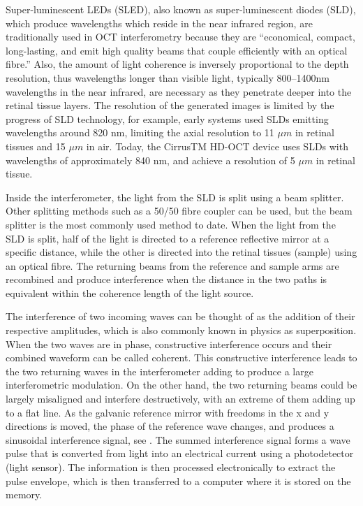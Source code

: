 Super-luminescent LEDs (SLED), also known as super-luminescent diodes (SLD),
which produce wavelengths which reside in the near infrared region, are
traditionally used in OCT interferometry because they are “economical,
compact, long-lasting, and emit high quality beams that couple efficiently
with an optical fibre.” \cite{mbib_6} Also, the amount of light coherence
is inversely proportional to the depth resolution, thus wavelengths longer
than visible light, typically 800–1400nm wavelengths in the near infrared,
are necessary as they penetrate deeper into the retinal tissue layers.\cite{mbib_4,mbib_7}
The resolution of the generated images is limited by the progress of SLD
technology, for example, early systems used SLDs emitting wavelengths around
820 nm, limiting the axial resolution to 11 $\mu m$ in retinal tissues and 15 $\mu m$
in air. \cite{mbib_6}  Today, the CirrusTM HD-OCT device uses SLDs with wavelengths
of approximately 840 nm, and achieve a resolution of 5 $\mu m$ in retinal tissue.\cite{mbib_7}

Inside the interferometer, the light from the SLD is split using a beam splitter.
Other splitting methods such as a 50/50 fibre coupler can be used, but the beam
splitter is the most commonly used method to date.  When the light from the SLD
is split, half of the light is directed to a reference reflective mirror at a
specific distance, while the other is directed into the retinal tissues (sample)
using an optical fibre.  The returning beams from the reference and sample arms
are recombined and produce interference when the distance in the two paths is
equivalent within the coherence length of the light source. \cite{mbib_5,mbib_6}

The interference of two incoming waves can be thought of as the addition of their
respective amplitudes, which is also commonly known in physics as superposition.
When the two waves are in phase, constructive interference occurs and their combined
waveform can be called coherent.  This constructive interference leads to the two
returning waves in the interferometer adding to produce a large interferometric
modulation.  On the other hand, the two returning beams could be largely misaligned
and interfere destructively, with an extreme of them adding up to a flat line.
As the galvanic reference mirror with freedoms in the x and y directions is moved,
the phase of the reference wave changes, and produces a sinusoidal interference
signal, see . The summed interference signal forms a wave pulse 
that is converted
from light into an electrical current using a photodetector (light sensor).\cite{mbib_6}
The information is then processed electronically to extract the pulse envelope, which
is then transferred to a computer where it is stored on the memory.\cite{mbib_6}

